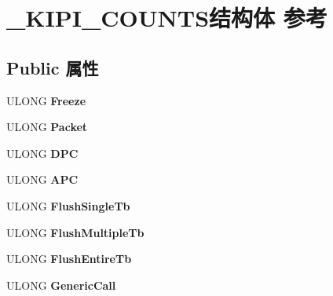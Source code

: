 \hypertarget{struct___k_i_p_i___c_o_u_n_t_s}{}\section{\+\_\+\+K\+I\+P\+I\+\_\+\+C\+O\+U\+N\+T\+S结构体 参考}
\label{struct___k_i_p_i___c_o_u_n_t_s}
\subsection*{Public 属性}
\begin{DoxyCompactItemize}
\item 
\mbox{\label{struct___k_i_p_i___c_o_u_n_t_s_a01d174dac44b8011d5c1c2c85f2de714}} 
U\+L\+O\+NG {\bfseries Freeze}
\item 
\mbox{\label{struct___k_i_p_i___c_o_u_n_t_s_a1c39958faa3f91de1da224fbf1420ddf}} 
U\+L\+O\+NG {\bfseries Packet}
\item 
\mbox{\label{struct___k_i_p_i___c_o_u_n_t_s_a6f5fe12f63d9e98766ef14d050b4d6f6}} 
U\+L\+O\+NG {\bfseries D\+PC}
\item 
\mbox{\label{struct___k_i_p_i___c_o_u_n_t_s_a18f6d4627b5c2a73ec770adb479f83f2}} 
U\+L\+O\+NG {\bfseries A\+PC}
\item 
\mbox{\label{struct___k_i_p_i___c_o_u_n_t_s_a102a9595dce1e957a3d1ab7b76b0a703}} 
U\+L\+O\+NG {\bfseries Flush\+Single\+Tb}
\item 
\mbox{\label{struct___k_i_p_i___c_o_u_n_t_s_a111f299b327c5b1117a97761cccfa038}} 
U\+L\+O\+NG {\bfseries Flush\+Multiple\+Tb}
\item 
\mbox{\label{struct___k_i_p_i___c_o_u_n_t_s_a265de4692e60c962e6a5966216deaa7a}} 
U\+L\+O\+NG {\bfseries Flush\+Entire\+Tb}
\item 
\mbox{\label{struct___k_i_p_i___c_o_u_n_t_s_a60118b9e20fe00a286749bbb8149159b}} 
U\+L\+O\+NG {\bfseries Generic\+Call}
\item 

\end{DoxyCompactItemize}
